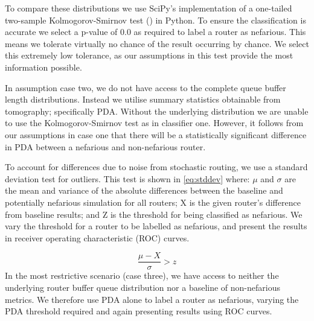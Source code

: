 To compare these distributions we use SciPy's implementation of a one-tailed two-sample Kolmogorov-Smirnov test (\cite{chakravarti_handbook_1967}) in Python. To ensure the classification is accurate we select a p-value of 0.0 as required to label a router as nefarious. This means we tolerate virtually no chance of the result occurring by chance. We select this extremely low tolerance, as our assumptions in this test provide the most information possible.\par
In assumption case two, we do not have access to the complete queue buffer length distributions. Instead we utilise summary statistics obtainable from tomography; specifically PDA. Without the underlying distribution we are unable to use the Kolmogorov-Smirnov test as in classifier one.  However, it follows from our assumptions in case one that there will be a statistically significant difference in PDA between a nefarious and non-nefarious router.\par
To account for differences due to noise from stochastic routing, we use a standard deviation test for outliers. This test is shown in \cref{eq:stddev} where: $\mu$ and $\sigma$ are the mean and variance of the absolute differences between the baseline and potentially nefarious simulation for all routers; X is the given router's difference from baseline results; and Z is the threshold for being classified as nefarious. We vary the threshold for a router to be labelled as nefarious, and present the results in receiver operating characteristic (ROC) curves.\par
\begin{equation}
\label{eq:stddev}
  \frac{\mu-X}{\sigma}>z
\end{equation}
In the most restrictive scenario (case three), we have access to neither the underlying router buffer queue distribution nor a baseline of non-nefarious metrics. We therefore use PDA alone to label a router as nefarious, varying the PDA threshold required and again presenting results using ROC curves.\par
  

